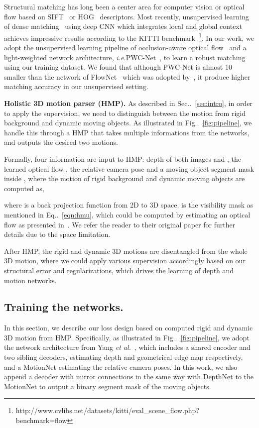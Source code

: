 \documentclass[runningheads]{llncs}
\makeatletter
\newcommand{\figref}[1]{Fig\onedot~\ref{#1}}
\newcommand{\equref}[1]{Eq\onedot~\eqref{#1}}
\newcommand{\secref}[1]{Sec\onedot~\ref{#1}}
\DeclareRobustCommand\onedot{\futurelet\@let@token\@onedot}
\def\onedot{\ifx\@let@token.\else.\null\fi\xspace}
\def\ie{\emph{i.e.}}
\def\etal{\emph{et al.}}
\makeatother
\begin{document}
Structural matching has long been a center area for computer vision or optical flow based on SIFT~\cite{lowe2004distinctive} or HOG~\cite{lowe1999object} descriptors. Most recently, unsupervised learning of dense matching~\cite{wang2017occlusion} using deep CNN which integrates local and global context achieves impressive results according to the KITTI benchmark~\footnote{http://www.cvlibs.net/datasets/kitti/eval\_scene\_flow.php?benchmark=flow}. 
In our work, we adopt the unsupervised learning pipeline of occlusion-aware optical flow~\cite{wang2017occlusion} and a light-weighted network architecture, \ie PWC-Net~\cite{sun2017pwc}, to learn a robust matching using our training dataset. We found that although PWC-Net is almost 10 smaller than the network of FlowNet~\cite{IMKDB17} which was adopted by~\cite{wang2017occlusion}, it produce higher matching accuracy in our unsupervised setting. 



\noindent\textbf{Holistic 3D motion parser (HMP).} 
As described in \secref{sec:intro}, in order to apply the supervision, we need to distinguish between the motion from rigid background and 
dynamic moving objects. As illustrated in \figref{fig:pipeline}, we handle this through a HMP that takes multiple informations from the networks, and outputs the desired two motions. 

Formally, four information are input to HMP: depth of both images  and , the learned optical flow , the relative camera pose  and a moving object segment mask  inside , where the motion of rigid background  and dynamic moving objects  are computed as,

where  is a back projection function from 2D to 3D space.  is the visibility mask as mentioned in \equref{eqn:hmu}, which could be computed by estimating an optical flow  as presented in~\cite{wang2017occlusion}. We refer the reader to their original paper for further details due to the space limitation.

After HMP, the rigid and dynamic 3D motions are disentangled from the whole 3D motion, where we could apply various supervision accordingly based on our structural error and regularizations, which drives the learning of depth and motion networks.

\subsection{Training the networks.}\label{subsec:training}
In this section, we describe our loss design based on computed rigid and dynamic 3D motion from HMP. 
Specifically, as illustrated in \figref{fig:pipeline}, we adopt the network architecture from Yang \etal~\cite{yang2018cvpr}, which includes a shared encoder and two sibling decoders, estimating depth  and geometrical edge map  respectively, and a MotionNet estimating the relative camera poses. In this work, we also append a decoder with mirror connections in the same way with DepthNet to the MotionNet to output a binary segment mask  of the moving objects.
\end{document}

